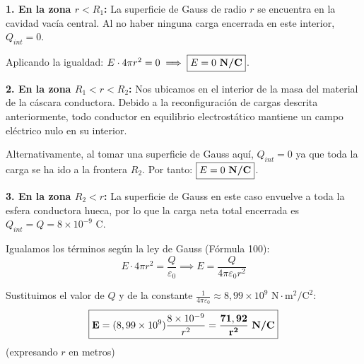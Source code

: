 \documentclass[11pt, a4paper]{article}
\newenvironment{problem}[1][Cuestión]{
		\vspace{0.5cm}
		\noindent{\Large\bfseries #1} \par\vspace{0.5cm}
}{
		\vspace{0.5cm}
}
\begin{document}
\begin{problem}[Cuestión 4]
\begin{enumerate}[label=\alph*)]
{					\textbf{1. En la zona $r < R_1$:}
					La superficie de Gauss de radio $r$ se encuentra en la cavidad vacía central. Al no haber ninguna carga encerrada en este interior, $Q_{int} = 0$. 

					Aplicando la igualdad: $E \cdot 4\pi r^2 = 0 \implies \boxed{E = 0 \text{ \textbf{N/C}}}$.

					\textbf{2. En la zona $R_1 < r < R_2$:}
					Nos ubicamos en el interior de la masa del material de la cáscara conductora. Debido a la reconfiguración de cargas descrita anteriormente, todo conductor en equilibrio electrostático mantiene un campo eléctrico nulo en su interior. 

					Alternativamente, al tomar una superficie de Gauss aquí, $Q_{int} = 0$ ya que toda la carga se ha ido a la frontera $R_2$. Por tanto: $\boxed{E = 0 \text{ \textbf{N/C}}}$.

					\textbf{3. En la zona $R_2 < r$:}
					La superficie de Gauss en este caso envuelve a toda la esfera conductora hueca, por lo que la carga neta total encerrada es $Q_{int} = Q = 8 \times 10^{-9} \text{ C}$. 

					Igualamos los términos según la ley de Gauss (Fórmula 100):
					$$E \cdot 4\pi r^2 = \frac{Q}{\varepsilon_0} \implies E = \frac{Q}{4\pi\varepsilon_0 r^2}$$

					Sustituimos el valor de $Q$ y de la constante $\frac{1}{4\pi\varepsilon_0} \approx 8,99 \times 10^9 \text{ N}\cdot\text{m}^2/\text{C}^2$:
					$$\boxed{{\mathbf{E}} = (8,99 \times 10^9) \frac{8 \times 10^{-9}}{r^2} = \mathbf{\frac{71,92}{r^2} \text{ \textbf{N/C}}}}$$ (expresando $r$ en metros)
				}
		\end{enumerate}
	\end{problem}
\end{document}
